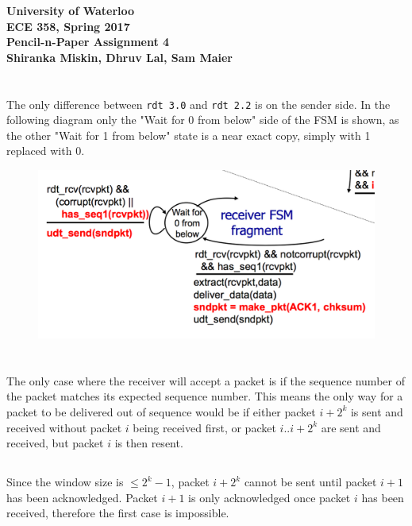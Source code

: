 \documentclass[12pt]{article}
\newcommand{\class}{ECE 358}
\newcommand{\subtitle}{Pencil-n-Paper Assignment 4}
\begin{document}
\begin{center}
{\Large\bf University of Waterloo}\\
\vspace{3mm}
{\Large\bf \class, Spring 2017}\\
\vspace{2mm}
{\Large\bf \subtitle}\\
\vspace{3mm}
\textbf{Shiranka Miskin, Dhruv Lal, Sam Maier}
\end{center}

\section{}

The only difference between \texttt{rdt 3.0} and \texttt{rdt 2.2} is on the
sender side.  In the following diagram only the "Wait for 0 from below" side of
the FSM is shown, as the other "Wait for 1 from below" state is a near exact
copy, simply with 1 replaced with 0.

\begin{figure}[!htb]
   \center
   \includegraphics[width=12cm]{fsm-receiver-22.png}
\end{figure}

\section{}

The only case where the receiver will accept a packet is if the sequence number
of the packet matches its expected sequence number.  This means the only way for
a packet to be delivered out of sequence would be if either packet $i + 2^k$ is sent
and received without packet $i$ being received first, or packet $i .. i + 2^k$
are sent and received, but packet $i$ is then resent.

\subsection{}
Since the window size is $\leq 2^k - 1$, packet $i + 2^k$ cannot be sent until
packet $i + 1$ has been acknowledged.  Packet $i + 1$ is only acknowledged once
packet $i$ has been received, therefore the first case is impossible.
\end{document}
